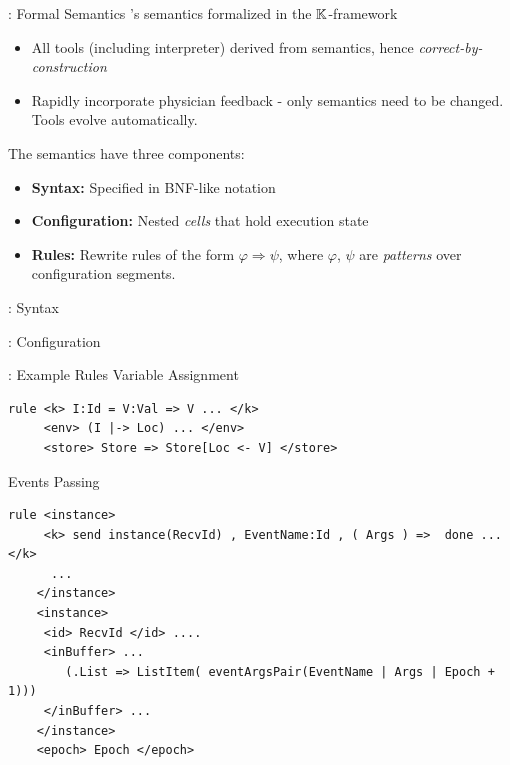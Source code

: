 \documentclass{beamer}
\begin{document}
\begin{frame}[fragile]{\MediK{}: Formal Semantics}
  \MediK{}'s semantics formalized in the $\mathbb{K}{}$-framework
  \begin{itemize}
    \item All tools (including interpreter) derived from semantics,
      hence \emph{correct-by-construction}
    \item Rapidly incorporate physician feedback - only
      semantics need to be changed. Tools evolve automatically.
  \end{itemize}
  \pause
  The semantics have three components:
  \begin{itemize}
    \item \textbf{Syntax:} Specified in BNF-like notation
    \item \textbf{Configuration:} Nested \emph{cells} that hold execution state
    \item \textbf{Rules:} Rewrite rules of the form $\varphi \Rightarrow \psi$,
      where $\varphi$, $\psi$ are \emph{patterns} over configuration segments.
  \end{itemize}
\end{frame}
\begin{frame}[fragile]{\MediK{}: Syntax}
  
\end{frame}
\begin{frame}[fragile]{\MediK{}: Configuration}
  
\end{frame}
\begin{frame}[fragile]{\MediK{}: Example Rules}
  Variable Assignment
  \begin{lstlisting}[language=k,style=ksty,basicstyle=\ttfamily\tiny]
rule <k> I:Id = V:Val => V ... </k>
     <env> (I |-> Loc) ... </env>
     <store> Store => Store[Loc <- V] </store>
  \end{lstlisting}
  \pause
  Events Passing
  \begin{lstlisting}[language=k,style=ksty,basicstyle=\ttfamily\tiny]
rule <instance>
     <k> send instance(RecvId) , EventName:Id , ( Args ) =>  done ... </k>
      ...
    </instance>
    <instance>
     <id> RecvId </id> ....
     <inBuffer> ...
        (.List => ListItem( eventArgsPair(EventName | Args | Epoch + 1)))
     </inBuffer> ...
    </instance>
    <epoch> Epoch </epoch>
  \end{lstlisting}
\end{frame}
\end{document}
